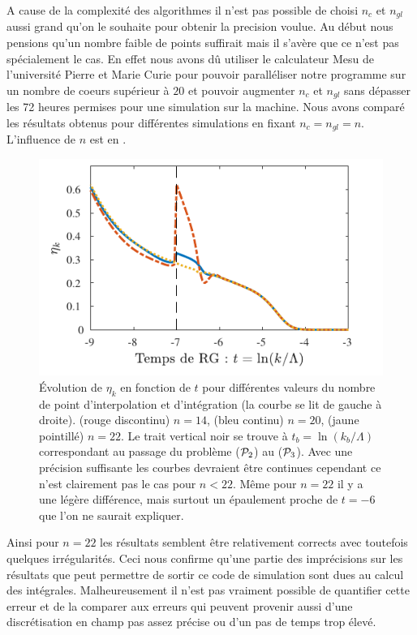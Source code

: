 \documentclass[10.5pt]{article}
\begin{document}
\begin{multicols}{2}
A cause de la complexité des algorithmes il n'est pas possible de choisi $n_c$ et $n_{gl}$ aussi grand qu'on le souhaite pour obtenir la precision voulue. Au début nous pensions qu'un nombre faible de points suffirait mais il s'avère que ce n'est pas spécialement le cas. En effet nous avons dû utiliser le calculateur Mesu \cite{ wiki:xxx} de l'université Pierre et Marie Curie pour pouvoir paralléliser notre programme sur un nombre de coeurs supérieur à $20$ et pouvoir augmenter $n_c$ et $n_{gl}$ sans dépasser les 72 heures permises pour une simulation sur la machine. Nous avons comparé les résultats obtenus pour différentes simulations en fixant $n_c = n_{gl} = n$. L'influence de $n$ est en .

\begin{figure}[H]
\begin{center}
	\includegraphics[width=0.95\columnwidth]{EtakErrMesu.pdf}
\end{center}
\caption{Évolution de $\eta_k$ en fonction de $t$ pour différentes valeurs du nombre de point d'interpolation et d'intégration (la courbe se lit de gauche à droite). (rouge discontinu) $n=14$, (bleu continu) $n=20$, (jaune pointillé) $n=22$. Le trait vertical noir se trouve à $t_b = \ln(k_b/\Lambda)$ correspondant au passage du problème ($\mathcal{P}_2$) au ($\mathcal{P}_3$). Avec une précision suffisante les courbes devraient être continues cependant ce n'est clairement pas le cas pour $n<22$. Même pour $n=22$ il y a une légère différence, mais surtout un épaulement proche de $t=-6$ que l'on ne saurait expliquer.}
\label{fig:etaErr}
\end{figure}

Ainsi pour $n=22$ les résultats semblent être relativement corrects avec toutefois quelques irrégularités. Ceci nous confirme qu'une partie des imprécisions sur les résultats que peut permettre de sortir ce code de simulation sont dues au calcul des intégrales. Malheureusement il n'est pas vraiment possible de quantifier cette erreur et de la comparer aux erreurs qui peuvent provenir aussi d'une discrétisation en champ pas assez précise ou d'un pas de temps trop élevé. \\




\end{multicols}
\end{document}
